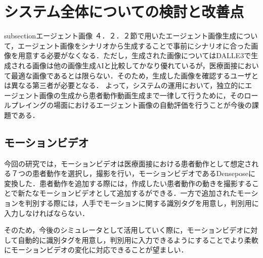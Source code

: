 \section{システム全体についての検討と改善点}\label{consideration_system}
subsection{エージェント画像}
４．２．２節で用いたエージェント画像生成について，エージェント画像をシナリオから生成することで事前にシナリオに合った画像を用意する必要がなくなる．ただし，生成された画像についてはDALLE3で生成される画像は他の画像生成AIと比較してかなり優れているが，医療面接において最適な画像であるとは限らない．そのため，生成した画像を確認するユーザとは異なる第三者が必要となる．
よって，システムの運用において，独立的にエージェント画像の生成から患者動作動画生成まで一律して行うために，そのロールプレイングの場面におけるエージェント画像の自動評価を行うことが今後の課題である．

\subsection{モーションビデオ}
今回の研究では，モーションビデオは医療面接における患者動作として想定される７つの患者動作を選択し，撮影を行い，モーションビデオであるDenseposeに変換した．患者動作を追加する際には，作成したい患者動作の動きを撮影することで新たなモーションビデオとして追加するができる．一方で追加されたモーションを判別する際には，人手でモーションに関する識別タグを用意し，判別用に入力しなければならない．
\par
そのため，今後のシミュレータとして活用していく際に，モーションビデオに対して自動的に識別タグを用意し，判別用に入力できるようにすることでより柔軟にモーションビデオの変化に対応できることが望ましい．
